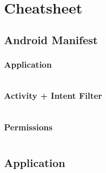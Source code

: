 \documentclass[12pt,a4paper,oneside,ngerman]{scrreprt}
\begin{document}
%

{}

\renewcommand{\chapterpagestyle}{scrheadings}
\def\labelitemi{-}

\setcounter{chapter}{0}
\renewcommand{\contentsname}{Inhaltsverzeichnis}
\tableofcontents 

\chapter{Cheatsheet}





\section{Android Manifest}

\subsection{Application}
\inputminted[breaklines]{xml}{application.xml}

\subsection{Activity + Intent Filter}
\inputminted[breaklines]{xml}{activity.xml}

\subsection{Permissions}
\inputminted[breaklines]{xml}{permissions.xml} 






\section{Application}
\end{document}

